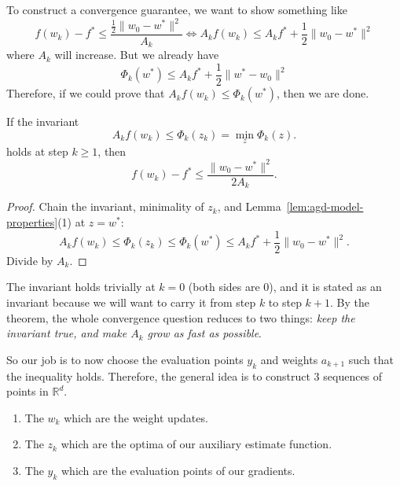 	To construct a convergence guarantee, we want to show something like 
	\begin{equation}
	 	f(w_k) - f^\ast \leq \frac{\frac{1}{2} \|w_0 - w^\ast\|^2}{A_k} \iff A_k f(w_k) \leq A_k f^\ast + \frac{1}{2} \|w_0 - w^\ast\|^2
	\end{equation}
	where $A_k$ will increase. But we already have 
	\begin{equation}
		\Phi_k (w^\ast) \leq A_k f^\ast + \frac{1}{2} \|w^\ast - w_0\|^2
	\end{equation}
	Therefore, if we could prove that $A_k f(w_k) \leq \Phi_k(w^\ast)$, then we are done. 

	\begin{theorem}
		\label{prop:agd-invariant-rate}
		If the invariant 
		\begin{equation}
			A_k f(w_k) \leq \Phi_k(z_k) = \min_z \Phi_k(z). \label{eq:agd-invariant}
		\end{equation}
		holds at step $k \geq 1$, then
		\begin{equation}
			f(w_k) - f^\ast \leq \frac{\|w_0 - w^\ast\|^2}{2 A_k}.
		\end{equation}
	\end{theorem}
	\begin{proof}
		Chain the invariant, minimality of $z_k$, and Lemma~\ref{lem:agd-model-properties}(1) at $z = w^\ast$:
		\begin{equation}
			A_k f(w_k) \leq \Phi_k(z_k) \leq \Phi_k(w^\ast) \leq A_k f^\ast + \frac{1}{2}\|w_0 - w^\ast\|^2.
		\end{equation}
		Divide by $A_k$.
	\end{proof}

	The invariant holds trivially at $k = 0$ (both sides are $0$), and it is stated as an invariant because we will want to carry it from step $k$ to step $k+1$. By the theorem, the whole convergence question reduces to two things: \textit{keep the invariant true, and make $A_k$ grow as fast as possible}. 


	So our job is to now choose the evaluation points $y_k$ and weights $a_{k+1}$ such that the inequality holds. Therefore, the general idea is to construct 3 sequences of points in $\mathbb{R}^d$. 
	\begin{enumerate}
	  \item The $w_k$ which are the weight updates. 
		\item The $z_k$ which are the optima of our auxiliary estimate function. 
		\item The $y_k$ which are the evaluation points of our gradients. 
	\end{enumerate}

